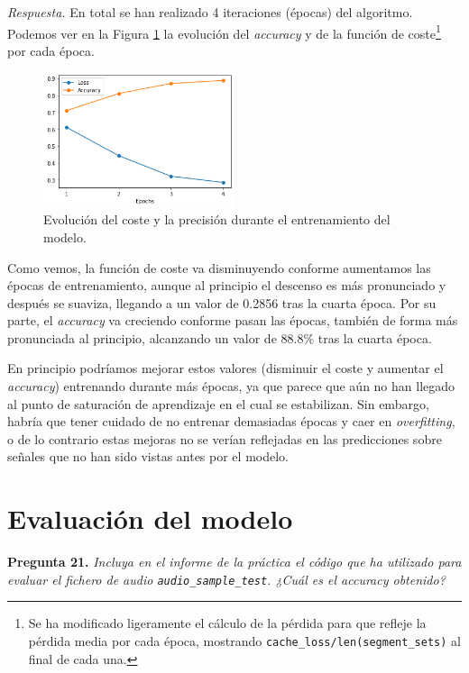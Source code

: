 \documentclass[11pt]{article}
\begin{document}
\textit{Respuesta.} En total se han realizado 4 iteraciones (épocas) del algoritmo. Podemos ver en la Figura \ref{fig:learning} la evolución del \textit{accuracy} y de la función de coste\footnote{Se ha modificado ligeramente el cálculo de la pérdida para que refleje la pérdida media por cada época, mostrando \texttt{cache\_loss/len(segment\_sets)} al final de cada una.} por cada época.

\begin{figure}[h!]
  \centering
  \includegraphics[width=0.5\textwidth]{img/learning_curves}
  \caption{Evolución del coste y la precisión durante el entrenamiento del modelo.}
  \label{fig:learning}
\end{figure}

Como vemos, la función de coste va disminuyendo conforme aumentamos las épocas de entrenamiento, aunque al principio el descenso es más pronunciado y después se suaviza, llegando a un valor de 0.2856 tras la cuarta época. Por su parte, el \textit{accuracy} va creciendo conforme pasan las épocas, también de forma más pronunciada al principio, alcanzando un valor de 88.8\% tras la cuarta época.

En principio podríamos mejorar estos valores (disminuir el coste y aumentar el \textit{accuracy}) entrenando durante más épocas, ya que parece que aún no han llegado al punto de saturación de aprendizaje en el cual se estabilizan. Sin embargo, habría que tener cuidado de no entrenar demasiadas épocas y caer en \textit{overfitting}, o de lo contrario estas mejoras no se verían reflejadas en las predicciones sobre señales que no han sido vistas antes por el modelo.

\section{Evaluación del modelo}

\textbf{Pregunta 21.} \textit{Incluya en el informe de la práctica el código que ha utilizado para evaluar el fichero de audio \texttt{audio\_sample\_test}. ¿Cuál es el accuracy obtenido?}
\end{document}
